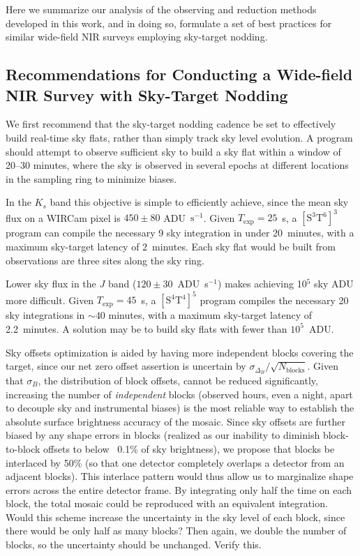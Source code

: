 \documentclass[iop]{emulateapj}
\newcommand{\todo}[1]{\textcolor{BurntOrange}{\textsf{#1}}} %
\begin{document}
Here we summarize our analysis of the observing and reduction methods developed in this work, and in doing so, formulate a set of best practices for similar wide-field NIR surveys employing sky-target nodding.

\subsection{Recommendations for Conducting a Wide-field NIR Survey with Sky-Target Nodding}

We first recommend that the sky-target nodding cadence be set to effectively build real-time sky flats, rather than simply track sky level evolution.
A program should attempt to observe sufficient sky to build a sky flat within a window of 20--30 minutes, where the sky is observed in several epochs at different locations in the sampling ring to minimize biases.

In the $K_s$ band this objective is simple to efficiently achieve, since the mean sky flux on a WIRCam pixel is $450 \pm 80$ ADU~$\mathrm{s^{-1}}$.
Given $T_\mathrm{exp}=25$~s, a $\mathrm{[S^3T^6]^3}$ program can compile the necessary 9 sky integration in under 20~minutes, with a maximum sky-target latency of 2~minutes.
Each sky flat would be built from observations are three sites along the sky ring.

Lower sky flux in the $J$ band ($120 \pm 30$~ADU~s$^{-1}$) makes achieving 10$^5$ sky ADU more difficult.
Given $T_\mathrm{exp}=45$~s, a $\mathrm{[S^4T^4]^5}$ program compiles the necessary 20 sky integrations in $\sim 40$ minutes, with a maximum sky-target latency of 2.2~minutes.
A solution may be to build sky flats with fewer than $10^5$~ADU.

Sky offsets optimization is aided by having more independent blocks covering the target, since our net zero offset assertion is uncertain by $\sigma_{\Delta_B} / \sqrt{N_\mathrm{blocks}}$.
Given that $\sigma_B$, the distribution of block offsets, cannot be reduced significantly, increasing the number of \emph{independent} blocks (observed hours, even a night, apart to decouple sky and instrumental biases) is the most reliable way to establish the absolute surface brightness accuracy of the mosaic.
Since sky offsets are further biased by any shape errors in blocks (realized as our inability to diminish block-to-block offsets to below ~0.1\% of sky brightness), we propose that blocks be interlaced by 50\% (so that one detector completely overlaps a detector from an adjacent blocks).
This interlace pattern would thus allow us to marginalize shape errors across the entire detector frame.
By integrating only half the time on each block, the total mosaic could be reproduced with an equivalent integration.
\todo{Would this scheme increase the uncertainty in the sky level of each block, since there would be only half as many blocks? Then again, we double the number of blocks, so the uncertainty should be unchanged. Verify this.}
\end{document}
